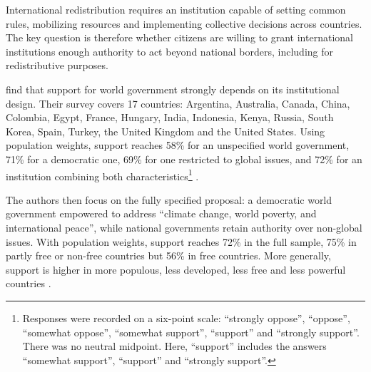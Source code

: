 

International redistribution requires an institution capable of setting common rules, mobilizing resources and implementing collective decisions across countries. The key question is therefore whether citizens are willing to grant international institutions enough authority to act beyond national borders, including for redistributive purposes. 

\citet{ghassim_who_2024} find that support for world government strongly depends on its institutional design. Their survey covers 17 countries: Argentina, Australia, Canada, China, Colombia, Egypt, France, Hungary, India, Indonesia, Kenya, Russia, South Korea, Spain, Turkey, the United Kingdom and the United States. Using population weights, support reaches 58\% for an unspecified world government, 71\% for a democratic one, 69\% for one restricted to global issues, and 72\% for an institution combining both characteristics\footnote{Responses were recorded on a six-point scale: ``strongly oppose'', ``oppose'', ``somewhat oppose'', ``somewhat support'', ``support'' and ``strongly support''. There was no neutral midpoint. Here, ``support'' includes the answers ``somewhat support'', ``support'' and ``strongly support''.} \citep[Figure 2]{ghassim_who_2024}.

The authors then focus on the fully specified proposal: a democratic world government empowered to address ``climate change, world poverty, and international peace'', while national governments retain authority over non-global issues. With population weights, support reaches 72\% in the full sample, 75\% in partly free or non-free countries but 56\% in free countries. More generally, support is higher in more populous, less developed, less free and less powerful countries \citep[Figures 2 \& 5]{ghassim_who_2024}.%

